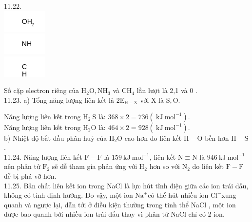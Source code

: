 \documentclass[10pt]{article}
\begin{document}
11.22.\\
\includegraphics{smile-ea9e0150f75bc402b8a96b6d6ef480c9ab57f577}\\
\includegraphics{smile-dd4d8f6e9ff15b828faafdcf81f0ab21a84af7b4}\\
\includegraphics{smile-d33e493f93455b8fcc8672c15fd332afe978e87d}

Số cặp electron riêng của $\mathrm{H}_{2} \mathrm{O}, \mathrm{NH}_{3}$ và $\mathrm{CH}_{4}$ lần lượt là 2,1 và 0 .\\
11.23. a) Tổng năng lượng liên kết là $2 \mathrm{E}_{\mathrm{H}-\mathrm{X}}$ với X là $\mathrm{S}, \mathrm{O}$.

Năng lượng liên kết trong $\mathrm{H}_{2} \mathrm{~S}$ là: $368 \times 2=736\left(\mathrm{~kJ} \mathrm{~mol}^{-1}\right)$.\\
Năng lượng liên kết trong $\mathrm{H}_{2} \mathrm{O}$ là: $464 \times 2=928\left(\mathrm{~kJ} \mathrm{~mol}^{-1}\right)$.\\
b) Nhiệt độ bắt đầu phân huỷ của $\mathrm{H}_{2} \mathrm{O}$ cao hơn do liên kết $\mathrm{H}-\mathrm{O}$ bền hơn $\mathrm{H}-\mathrm{S}$.\\
11.24. Năng lượng liên kết $\mathrm{F}-\mathrm{F}$ là $159 \mathrm{~kJ} \mathrm{~mol}^{-1}$, liên kết $\mathrm{N} \equiv \mathrm{N}$ là $946 \mathrm{~kJ} \mathrm{~mol}^{-1}$ nên phân tử $\mathrm{F}_{2}$ sẽ dễ tham gia phản ứng với $\mathrm{H}_{2}$ hơn so với $\mathrm{N}_{2}$ do liên kết $\mathrm{F}-\mathrm{F}$ dễ bị phá vỡ hơn.\\
11.25. Bản chất liên kết ion trong NaCl là lực hút tĩnh điện giữa các ion trái dấu, không có tính định hướng. Do vậy, một ion $\mathrm{Na}^{+}$có thể hút nhiều ion $\mathrm{Cl}^{-}$xung quanh và ngược lại, dẫn tới ở điều kiện thường trong tinh thể NaCl , một ion được bao quanh bởi nhiều ion trái dấu thay vì phân tử NaCl chỉ có 2 ion.
\end{document}
